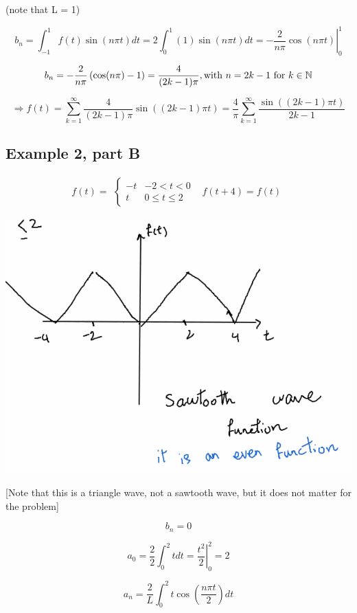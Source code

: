 \documentclass{article}
\begin{document}
(note that L = 1)

$$b_n = \int_{-1}^1 f(t) \sin(n \pi t) dt = 2 \int_{0}^{1} (1) \sin(n \pi t) dt = \left. - \frac{2}{n \pi} \cos(n \pi t) \right|_{0}^{1}$$

$$b_n = - \frac{2}{n \pi} \left( \cos(n \pi) - 1 \right) = \frac{4}{(2k - 1) \pi}, \text{with } n = 2k-1 \text{ for } k \in \mathbb{N}$$

$$\Rightarrow f(t) = \sum_{k = 1}^\infty \frac{4}{(2k-1) \pi} \sin \left( (2k-1) \pi t \right) = \frac{4}{\pi} \sum_{k = 1}^\infty \frac{\sin \left( (2k-1) \pi t \right)}{2k-1}$$

\subsection{Example 2, part B}

$$f(t) = \begin{matrix} \left\{ \begin{matrix} -t & -2 < t < 0 \\ t & 0 \leq t \leq 2 \end{matrix} \right. & f(t+4) = f(t) \end{matrix} $$

\includegraphics[width = 0.95 \textwidth]{image2.png}

[Note that this is a triangle wave, not a sawtooth wave, but it does not matter for the problem]

$$b_n = 0$$

$$a_0 = \frac{2}{2} \int_{0}^2 t dt = \left. \frac{t^2}{2} \right|_0^2 = 2$$

$$a_n = \frac{2}{L} \int_{0}^2 t \cos (\frac{n \pi t}{2}) dt$$
\end{document}
